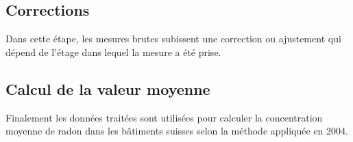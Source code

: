 \subsection{Corrections}
Dans cette étape, les mesures brutes subissent une correction ou ajustement qui dépend de l'étage dans lequel la mesure a été prise. 

\subsection{Calcul de la valeur moyenne}
Finalement les données traitées sont utilisées pour calculer la concentration moyenne de radon dans les bâtiments suisses selon la méthode appliquée en 2004. 


